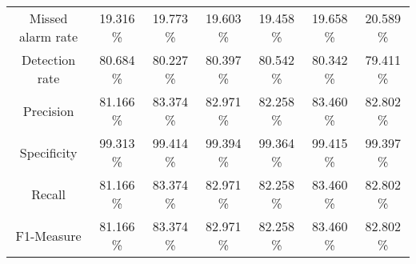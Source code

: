 \begin{table}[htb]
\begin{tabular}{@{}ccccccc@{}}
        Missed alarm rate &  19.316 \% &  19.773 \% &  19.603 \% &  19.458 \% &  19.658 \% &  20.589 \% \\
        Detection rate &  80.684 \% &  80.227 \% &  80.397 \% &  80.542 \% &  80.342 \% &  79.411 \% \\
        Precision &  81.166 \% &  83.374 \% &  82.971 \% &  82.258 \% &  83.460 \% &  82.802 \% \\
        Specificity &  99.313 \% &  99.414 \% &  99.394 \% &  99.364 \% &  99.415 \% &  99.397 \% \\
        Recall &  81.166 \% &  83.374 \% &  82.971 \% &  82.258 \% &  83.460 \% &  82.802 \% \\
        F1-Measure &  81.166 \% &  83.374 \% &  82.971 \% &  82.258 \% &  83.460 \% &  82.802 \% \\
        \bottomrule
    \end{tabular}
\end{table}